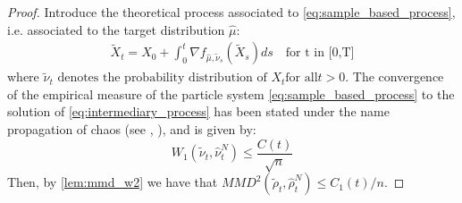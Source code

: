 \begin{proof} 
	Introduce the theoretical process associated to \eqref{eq:sample_based_process}, i.e. associated to the target distribution $\widehat{\mu}$:
	\begin{align}\label{eq:intermediary_process}
	\widetilde{X}_t=X_{0}+\int_{0}^t \nabla f_{\widehat{\mu}, \widetilde{\nu}_s}(\widetilde{X}_s)ds \quad \text{for t in [0,T]}
	\end{align}
	where $\widetilde{\nu}_t \text{ denotes the probability distribution of } X_t \text{for all} t>0$. The convergence of the empirical measure of the particle system \eqref{eq:sample_based_process} to the solution of \eqref{eq:intermediary_process} has been stated under the name propagation of chaos (see \cite{kac1956foundations}, \cite{sznitman1991topics}), and is given by:
	\begin{equation}
	W_1(\widetilde{\nu}_t,\widehat{\nu}_t^N)\le \frac{C(t)}{\sqrt{n}}
	\end{equation}
	Then, by \cref{lem:mmd_w2} we have that $MMD^2(\widetilde{\rho}_t,\widehat{\rho}_t^N)\le C_1(t)/n$.%
	

\end{proof}
